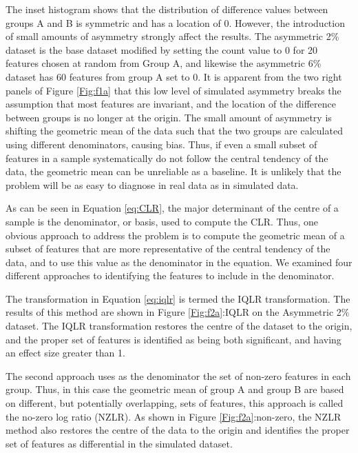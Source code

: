 \documentclass{bmcart}
\begin{document}
The inset histogram shows that the distribution of difference values between groups A and B is symmetric and has a location of 0. However, the introduction of small amounts of asymmetry strongly affect the results. The asymmetric 2\% dataset is the base dataset modified by setting the count value to 0 for 20 features chosen at random from Group A, and likewise the asymmetric 6\% dataset has 60 features from group A set to 0. It is apparent from the two right panels of Figure \ref{Fig:f1a} that this low level of simulated asymmetry breaks the assumption that most features are invariant, and the location of the difference between groups is no longer at the origin.  The small amount of asymmetry is shifting the geometric mean of the data such that the two groups are calculated using different denominators, causing bias. Thus, if even a small subset of features in a sample systematically do not follow the central tendency of the data, the geometric mean can be unreliable as a baseline. It is unlikely that the problem will be as easy to diagnose in real data as in simulated data. 

As can be seen in Equation \ref{eq:CLR}, the major determinant of the centre of a sample is the denominator, or basis, used to compute the CLR. Thus, one obvious approach to address the problem is to compute the geometric mean of a subset of features that are more representative of the central tendency of the data, and to use this value as the denominator in the equation. We  examined four different approaches to identifying the features to include in the denominator. 

 
 
The transformation in Equation \ref{eq:iqlr} is termed the IQLR transformation. The results of this method are shown in Figure \ref{Fig:f2a}:IQLR on the Asymmetric 2\% dataset. The IQLR transformation restores the centre of the dataset to the origin, and the proper set of features is identified as being both significant, and having an effect size greater than 1.


The second approach uses as the denominator the set of non-zero features in each group.  Thus, in this case the geometric mean of group A and group B are based on different, but potentially overlapping, sets of features, this approach is called the no-zero log ratio (NZLR). As shown in Figure \ref{Fig:f2a}:non-zero, the NZLR method also restores the centre of the data to the origin and identifies the proper set of features as differential in the simulated dataset. 
\end{document}
